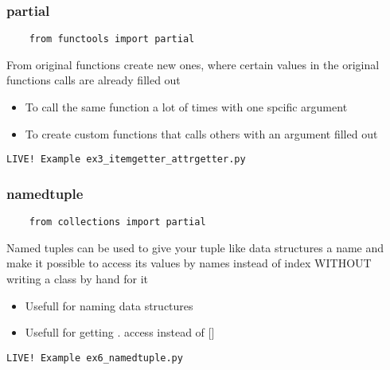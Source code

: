 \documentclass{beamer}
\begin{document}
\begin{frame}[fragile]
  \frametitle{partial}
  \begin{verbatim}
    from functools import partial
  \end{verbatim}
  \begin{block}{\vspace*{-3ex}}
    From original functions create new ones, where certain values in
    the original functions calls are already filled out
  \end{block}
  \begin{itemize}
  \item To call the same function a lot of times with one spcific
    argument
  \item To create custom functions that calls others with an argument
    filled out
  \end{itemize}
  \begin{center}
    \texttt{LIVE! Example ex3\_itemgetter\_attrgetter.py}
  \end{center}
\end{frame}

\begin{frame}[fragile]
  \frametitle{namedtuple}
  \begin{verbatim}
    from collections import partial
  \end{verbatim}
  \begin{block}{\vspace*{-3ex}}
    Named tuples can be used to give your tuple like data structures a
    name and make it possible to access its values by names instead of
    index WITHOUT writing a class by hand for it
  \end{block}
  \begin{itemize}
  \item Usefull for naming data structures
  \item Usefull for getting . access instead of []
  \end{itemize}
  \begin{center}
    \texttt{LIVE! Example ex6\_namedtuple.py}
  \end{center}
\end{frame}

\end{document}
